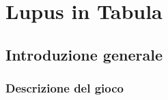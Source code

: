 \documentclass[b5paper,10pt,twoside,cucitura]{toptesi}
\begin{document}

\frontespizio

\sommario



\indici

\mainmatter

\part{Lupus in Tabula}
\chapter{Introduzione generale}

\section{Descrizione del gioco}
\end{document}
